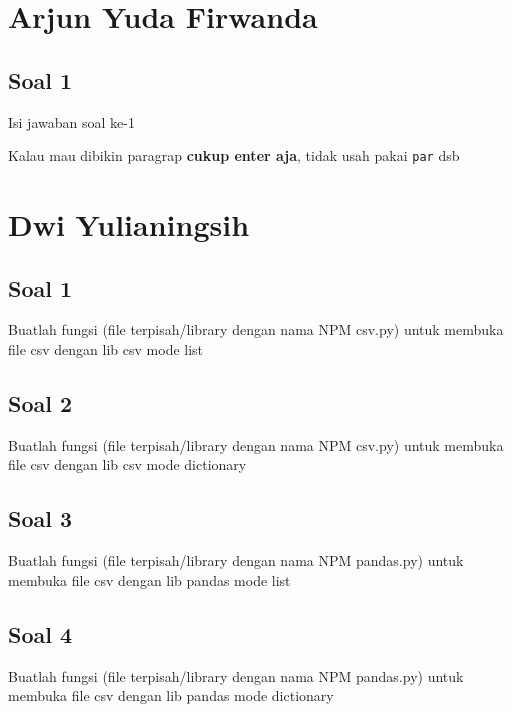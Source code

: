 \section{Arjun Yuda Firwanda}
\subsection{Soal 1}
Isi jawaban soal ke-1

Kalau mau dibikin paragrap \textbf{cukup enter aja}, tidak usah pakai \verb|par| dsb



\section{Dwi Yulianingsih}
\subsection{Soal 1}
Buatlah fungsi (file terpisah/library dengan nama NPM csv.py) untuk membuka file csv dengan lib csv mode list



\subsection{Soal 2}
Buatlah fungsi (file terpisah/library dengan nama NPM csv.py) untuk membuka file csv dengan lib csv mode dictionary


\subsection{Soal 3}
Buatlah fungsi (file terpisah/library dengan nama NPM pandas.py) untuk membuka file csv dengan lib pandas mode list


\subsection{Soal 4}
Buatlah fungsi (file terpisah/library dengan nama NPM pandas.py) untuk membuka file csv dengan lib pandas mode dictionary


